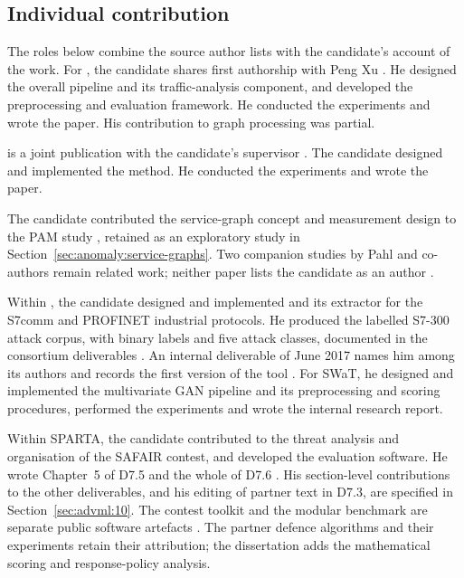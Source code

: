 
\subsection*{Individual contribution}

The roles below combine the source author lists with the candidate's account of the work.
For \hybroid{}, the candidate shares first authorship with Peng Xu
\cite{norouzian2021hybroid}. He designed the overall pipeline and its traffic-analysis
component, and developed the preprocessing and evaluation framework. He conducted the
experiments and wrote the paper. His contribution to graph processing was partial.

\hgann{} is a joint publication with the candidate's supervisor
\cite{norouzian2025hgannmal}. The candidate designed and implemented the method. He
conducted the experiments and wrote the paper.

The candidate contributed the service-graph concept and measurement design to the PAM study
\cite{aubet2018graph}, retained as an exploratory study in
Section~\ref{sec:anomaly:service-graphs}. Two companion studies by Pahl and co-authors remain
related work; neither paper lists the candidate as an author
\cite{pahl2018all,pahl2018graphbased}.

Within \iuno{}, the candidate designed and implemented \nadics{} and its extractor for the
S7comm and PROFINET industrial protocols. He produced the labelled S7-300 attack corpus, with
binary labels and five attack classes, documented in the consortium deliverables
\cite{iuno_ap4,iuno_ap7}.
An internal deliverable of June 2017 names him among its authors and records the first
version of the tool \cite{iuno2017d42}. For SWaT, he designed and implemented the
multivariate GAN pipeline and its preprocessing and scoring procedures, performed the
experiments and wrote the internal research report.

Within SPARTA, the candidate contributed to the threat analysis and organisation of the
SAFAIR contest, and developed the evaluation software. He wrote Chapter~5 of D7.5 and the
whole of D7.6 \cite{sparta2021d75,sparta2022d76}. His section-level contributions to the other
deliverables, and his editing of partner text in D7.3, are specified in
Section~\ref{sec:advml:10}. The contest toolkit and the modular benchmark are separate public
software artefacts \cite{norouzian2021safairtoolkit,norouzian2021adversarialbenchmark}.
The partner defence algorithms and their experiments retain their attribution; the
dissertation adds the mathematical scoring and response-policy analysis.

